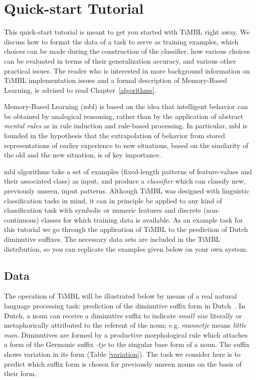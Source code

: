 \documentclass{book}
\begin{document}
\chapter{Quick-start Tutorial}
\label{tutorial}

This quick-start tutorial is meant to get you started with TiMBL
right away. We discuss how to format the data of a task to serve as
training examples, which choices can be made during the construction
of the classifier, how various choices can be evaluated in terms of
their generalization accuracy, and various other practical issues. The
reader who is interested in more background information on TiMBL
implementation issues and a formal description of Memory-Based
Learning, is advised to read Chapter~\ref{algorithms}.

Memory-Based Learning ({\sc mbl}) is based on the idea that
intelligent behavior can be obtained by analogical reasoning, rather
than by the application of abstract {\em mental rules} as in rule
induction and rule-based processing. In particular, {\sc mbl} is
founded in the hypothesis that the extrapolation of behavior from
stored representations of earlier experience to new situations, based
on the similarity of the old and the new situation, is of key
importance.

{\sc mbl} algorithms take a set of examples (fixed-length patterns of
feature-values and their associated class) as input, and produce a
{\em classifier} which can classify new, previously unseen, input
patterns. Although TiMBL was designed with linguistic classification
tasks in mind, it can in principle be applied to any kind of
classification task with symbolic or numeric features and discrete
(non-continuous) classes for which training data is available. As an
example task for this tutorial we go through the application of TiMBL
to the prediction of Dutch diminutive suffixes. The necessary data
sets are included in the TiMBL distribution, so you can replicate the
examples given below on your own system.

\section{Data}

The operation of TiMBL will be illustrated below by means of a real
natural language processing task: prediction of the diminutive suffix
form in Dutch~\cite{Daelemans+97b}. In Dutch, a noun can receive a
diminutive suffix to indicate {\em small size} literally or
metaphorically attributed to the referent of the noun; e.g. {\em
mannetje} means {\em little man}. Diminutives are formed by a
productive morphological rule which attaches a form of the Germanic
suffix {\em -tje} to the singular base form of a noun. The suffix
shows variation in its form (Table \ref{variation}). The task we
consider here is to predict which suffix form is chosen for previously
unseen nouns on the basis of their form.
\end{document}
